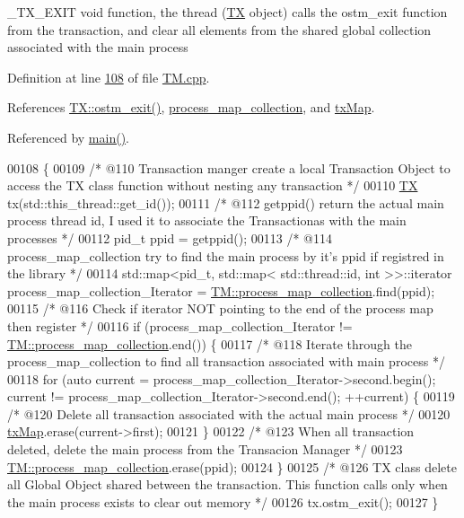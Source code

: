 \+\_\+\+T\+X\+\_\+\+E\+X\+IT void function, the thread (\hyperlink{class_t_x}{TX} object) calls the ostm\+\_\+exit function from the transaction, and clear all elements from the shared global collection associated with the main process 

Definition at line \hyperlink{_t_m_8cpp_source_l00108}{108} of file \hyperlink{_t_m_8cpp_source}{T\+M.\+cpp}.



References \hyperlink{_t_x_8cpp_source_l00068}{T\+X\+::ostm\+\_\+exit()}, \hyperlink{_t_m_8h_source_l00095}{process\+\_\+map\+\_\+collection}, and \hyperlink{_t_m_8h_source_l00091}{tx\+Map}.



Referenced by \hyperlink{main_8cpp_source_l00142}{main()}.


\begin{DoxyCode}
00108                  \{
00109     \textcolor{comment}{/*  @110 Transaction manger create a local Transaction Object to access the TX class function without
       nesting any transaction */}
00110     \hyperlink{class_t_x}{TX} tx(std::this\_thread::get\_id());
00111     \textcolor{comment}{/* @112 getppid() return the actual main process thread id, I used it to associate the Transactionas
       with the main processes */}
00112     pid\_t ppid = getppid();
00113     \textcolor{comment}{/* @114 process\_map\_collection try to find the main process by it's ppid if registred in the library */}
00114     std::map<pid\_t, std::map< std::thread::id, int >>::iterator process\_map\_collection\_Iterator = 
      \hyperlink{class_t_m_a6d417b18213968da2a70a914e80d639b_a6d417b18213968da2a70a914e80d639b}{TM::process\_map\_collection}.find(ppid);
00115     \textcolor{comment}{/* @116 Check if iterator NOT pointing to the end of the process map then register */}
00116     \textcolor{keywordflow}{if} (process\_map\_collection\_Iterator != \hyperlink{class_t_m_a6d417b18213968da2a70a914e80d639b_a6d417b18213968da2a70a914e80d639b}{TM::process\_map\_collection}.end()) \{
00117         \textcolor{comment}{/* @118 Iterate through the process\_map\_collection to find all transaction associated with main
       process */}
00118         \textcolor{keywordflow}{for} (\textcolor{keyword}{auto} current = process\_map\_collection\_Iterator->second.begin(); current != 
      process\_map\_collection\_Iterator->second.end(); ++current) \{
00119             \textcolor{comment}{/* @120 Delete all transaction associated with the actual main process */}
00120             \hyperlink{class_t_m_a0333dfa193ea99d7626de74a2b932e9b_a0333dfa193ea99d7626de74a2b932e9b}{txMap}.erase(current->first);
00121         \}
00122         \textcolor{comment}{/* @123 When all transaction deleted, delete the main process from the Transacion Manager */}
00123         \hyperlink{class_t_m_a6d417b18213968da2a70a914e80d639b_a6d417b18213968da2a70a914e80d639b}{TM::process\_map\_collection}.erase(ppid);
00124     \}
00125     \textcolor{comment}{/* @126 TX class delete all Global Object shared between the transaction. This function calls only when
       the main process exists to clear out memory */}
00126     tx.ostm\_exit();
00127 \}
\end{DoxyCode}


